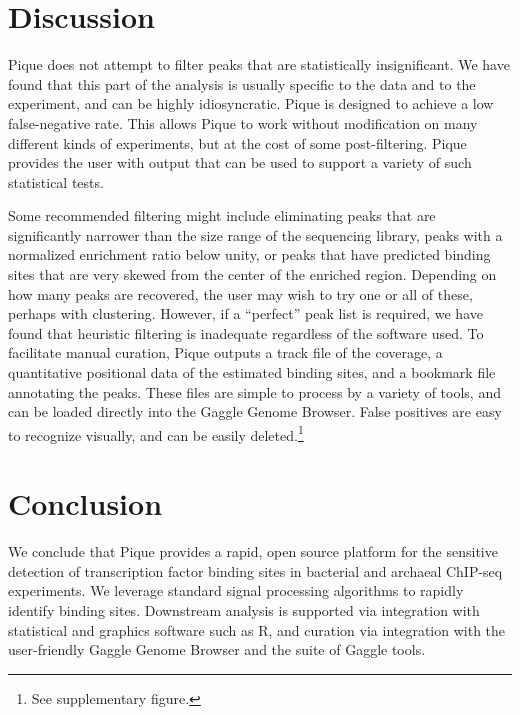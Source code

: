 \documentclass{bioinfo}
\begin{document}
\section{Discussion}

Pique does not attempt to filter peaks that are statistically
insignificant. We have found that this part of the analysis is usually
specific to the data and to the experiment, and can be highly
idiosyncratic. Pique is designed to achieve a low false-negative
rate. This allows Pique to work without modification on many different
kinds of experiments, but at the cost of some post-filtering. Pique
provides the user with output that can be used to support a variety of
such statistical tests.

Some recommended filtering might include eliminating peaks that are
significantly narrower than the size range of the sequencing library,
peaks with a normalized enrichment ratio below unity, or peaks that
have predicted binding sites that are very skewed from the center of
the enriched region. Depending on how many peaks are recovered, the
user may wish to try one or all of these, perhaps with
clustering. However, if a ``perfect'' peak list is required, we have
found that heuristic filtering is inadequate regardless of the
software used. To facilitate manual curation, Pique outputs a track
file of the coverage, a quantitative positional data of the estimated
binding sites, and a bookmark file annotating the peaks. These files
are simple to process by a variety of tools, and can be loaded
directly into the Gaggle Genome Browser. False positives are easy to
recognize visually, and can be easily deleted.\footnote{See
  supplementary figure.}







\section{Conclusion}

We conclude that Pique provides a rapid, open source platform for the
sensitive detection of transcription factor binding sites in bacterial
and archaeal ChIP-seq experiments. We leverage standard signal
processing algorithms to rapidly identify binding sites. Downstream
analysis is supported via integration with statistical and graphics
software such as R, and curation via integration with the
user-friendly Gaggle Genome Browser and the suite of Gaggle tools.
\end{document}
